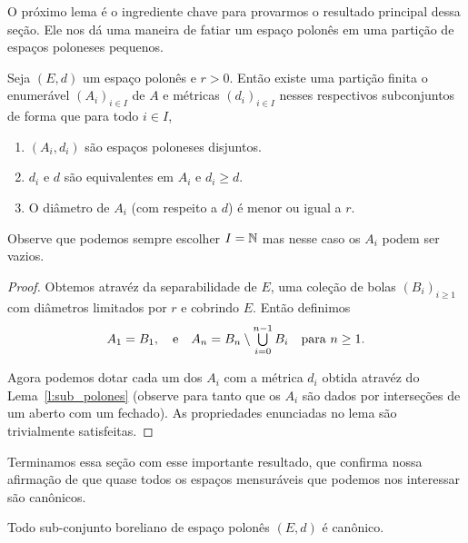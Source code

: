 O próximo lema é o ingrediente chave para provarmos o resultado principal dessa seção.
Ele nos dá uma maneira de fatiar um espaço polonês em uma partição de espaços poloneses pequenos.

\begin{lemma}
  \label{l:particao_polones}
  Seja $(E, d)$ um espaço polonês e $r > 0$.
  Então existe uma partição finita o enumerável $(A_i)_{i\in I}$ de $A$ e métricas $(d_i)_{i\in I}$ nesses respectivos subconjuntos de forma
  que para todo $i\in I$,
  \begin{enumerate}[\quad a)]
  \item $(A_i, d_i)$ são espaços poloneses disjuntos.
  \item $d_i$ e $d$ são equivalentes em $A_i$ e $d_i \geq d$.
  \item O diâmetro de $A_i$ (com respeito a $d$) é menor ou igual a $r$.
  \end{enumerate}
  Observe que podemos sempre escolher $I={\mathbb N}$ mas nesse caso os $A_i$ podem ser vazios.
\end{lemma}

\begin{proof}
  Obtemos atravéz da separabilidade de $E$, uma coleção de bolas $(B_i)_{i \geq 1}$ com diâmetros limitados por $r$ e cobrindo $E$.
  Então definimos
  \begin{equation}
    A_1 = B_1, \quad \text{e} \quad A_n = B_n \setminus \operatorname*{{\textstyle \bigcup}}_{i=0}^{n-1} B_i \quad \text{para $n \geq 1$.}
  \end{equation}

  Agora podemos dotar cada um dos $A_i$ com a métrica $d_i$ obtida atravéz do Lema~\ref{l:sub_polones} (observe para tanto que os $A_i$ são dados por interseções de um aberto com um fechado).
  As propriedades enunciadas no lema são trivialmente satisfeitas.
\end{proof}

Terminamos essa seção com esse importante resultado, que confirma nossa afirmação de que quase todos os espaços mensuráveis que podemos nos interessar são canônicos.

\begin{theorem}
  Todo sub-conjunto boreliano de espaço polonês $(E, d)$ é canônico.
\end{theorem}

